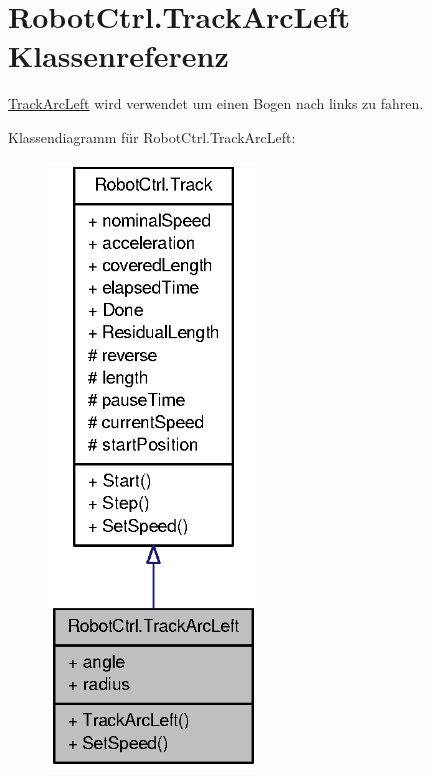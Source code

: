 \hypertarget{class_robot_ctrl_1_1_track_arc_left}{
\section{RobotCtrl.TrackArcLeft Klassenreferenz}
\label{class_robot_ctrl_1_1_track_arc_left}
}


\hyperlink{class_robot_ctrl_1_1_track_arc_left}{TrackArcLeft} wird verwendet um einen Bogen nach links zu fahren.  




Klassendiagramm für RobotCtrl.TrackArcLeft:\nopagebreak
\begin{figure}[H]
\begin{center}
\leavevmode
\includegraphics[width=158pt]{class_robot_ctrl_1_1_track_arc_left__inherit__graph}
\end{center}
\end{figure}


